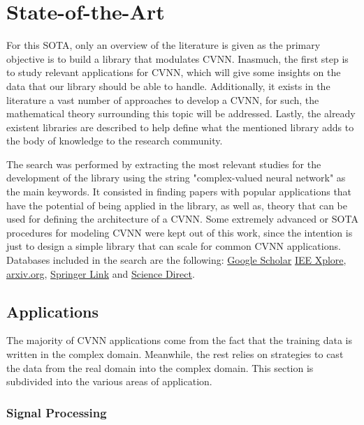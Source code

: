 
\chapter{State-of-the-Art}
\label{sec:chap1_sota}

For this \gls{SOTA}, only an overview of the literature is given as the primary objective is to build a library that modulates \gls{CVNN}. Inasmuch, the first step is to study relevant applications for \gls{CVNN}, which will give some insights on the data that our library should be able to handle. Additionally, it exists in the literature a vast number of approaches to develop a \gls{CVNN}, for such, the mathematical theory surrounding this topic will be addressed. Lastly, the already existent libraries are described to help define what the mentioned library adds to the body of knowledge to the research community.

The search was performed by extracting the most relevant studies for the development of the library using the string "complex-valued neural network" as the main keywords. It consisted in finding papers with popular applications that have the potential of being applied in the library, as well as, theory that can be used for defining the architecture of a \gls{CVNN}. Some extremely advanced or \gls{SOTA} procedures for modeling \gls{CVNN} were kept out of this work, since the intention is just to design a simple library that can scale for common \gls{CVNN} applications. Databases included in the search are the following: \href{https://scholar.google.com/}{Google Scholar} \href{https://ieeexplore.ieee.org/Xplore/home.jsp}{IEE Xplore}, \href{https://arxiv.org/}{arxiv.org}, \href{https://link.springer.com/}{Springer Link} and \href{https://www.sciencedirect.com/}{Science Direct}.

\section{Applications}
The majority of \gls{CVNN} applications come from the fact that the training data is written in the complex domain. Meanwhile, the rest relies on strategies to cast the data from the real domain into the complex domain. This section is subdivided into the various areas of application.

\subsection{Signal Processing}

